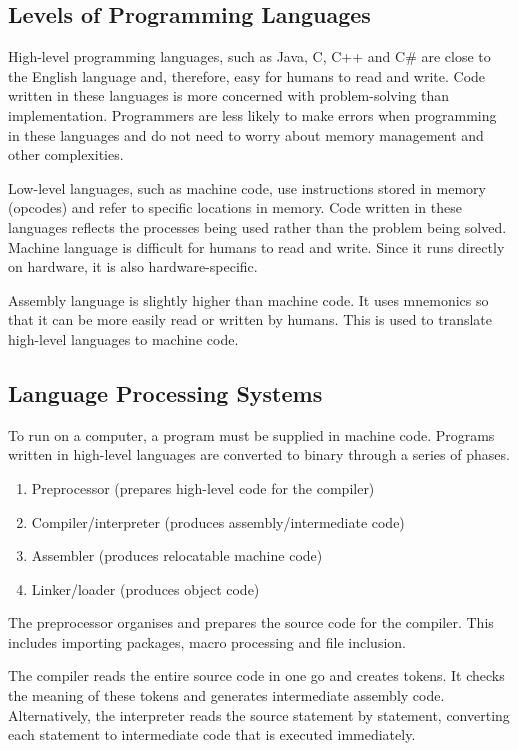 
\subsection{Levels of Programming Languages}


High-level programming languages, such as Java, C, C++ and C\# are close to the English language and, therefore, easy for humans to read and write.
Code written in these languages is more concerned with problem-solving than implementation.
Programmers are less likely to make errors when programming in these languages and do not need to worry about memory management and other complexities.

Low-level languages, such as machine code, use instructions stored in memory (opcodes) and refer to specific locations in memory.
Code written in these languages reflects the processes being used rather than the problem being solved.
Machine language is difficult for humans to read and write.
Since it runs directly on hardware, it is also hardware-specific.

Assembly language is slightly higher than machine code.
It uses mnemonics so that it can be more easily read or written by humans.
This is used to translate high-level languages to machine code.

\subsection{Language Processing Systems}

To run on a computer, a program must be supplied in machine code.
Programs written in high-level languages are converted to binary through a series of phases.

\begin{enumerate}
  \item Preprocessor (prepares high-level code for the compiler)
  \item Compiler/interpreter (produces assembly/intermediate code)
  \item Assembler (produces relocatable machine code)
  \item Linker/loader (produces object code)
\end{enumerate}

The preprocessor organises and prepares the source code for the compiler.
This includes importing packages, macro processing and file inclusion.

The compiler reads the entire source code in one go and creates tokens.
It checks the meaning of these tokens and generates intermediate assembly code.
Alternatively, the interpreter reads the source statement by statement, converting each statement to intermediate code that is executed immediately.

